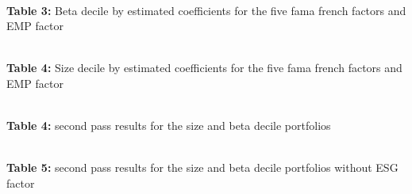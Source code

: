 \documentclass[12pt,oneside,reqno]{amsart}
\begin{document}
\begin{center}
\\
\textbf{Table 3:} Beta decile by estimated coefficients for the  five fama french factors and EMP factor\\
\end{center}
\vspace{1cm}
\begin{center}
\\
\textbf{Table 4:} Size decile by estimated coefficients for the  five fama french factors and EMP factor\\
\end{center}

\begin{center}
    \\
    \textbf{Table 4:} second pass results for the size and beta decile portfolios\\
\end{center}

\begin{center}
    \\
    \textbf{Table 5:} second pass results for the size and beta decile portfolios without ESG factor\\
\end{center}

\clearpage
\restoregeometry


%
\end{document}

